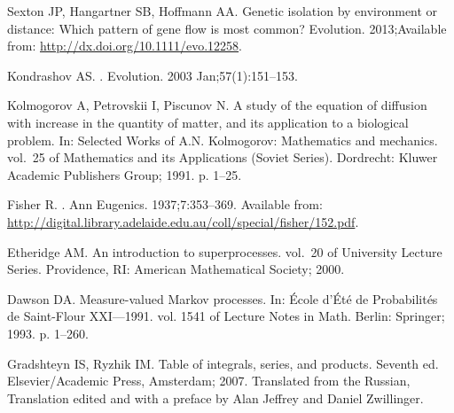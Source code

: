 \documentclass[10pt,letterpaper]{article}
\begin{document}
\begin{thebibliography}{10}
Sexton JP, Hangartner SB, Hoffmann AA.
\newblock Genetic isolation by environment or distance: Which pattern of gene
  flow is most common?
\newblock Evolution. 2013;Available from:
  \url{http://dx.doi.org/10.1111/evo.12258}.

Kondrashov AS.
.
\newblock Evolution. 2003 Jan;57(1):151--153.

Kolmogorov A, Petrovskii I, Piscunov N.
\newblock A study of the equation of diffusion with increase in the quantity of
  matter, and its application to a biological problem.
\newblock In: Selected Works of A.N. Kolmogorov: Mathematics and mechanics.
  vol.~25 of Mathematics and its Applications (Soviet Series). Dordrecht:
  Kluwer Academic Publishers Group; 1991. p. 1--25.

Fisher R.
.
\newblock Ann Eugenics. 1937;7:353--369.
\newblock Available from:
  \url{http://digital.library.adelaide.edu.au/coll/special/fisher/152.pdf}.

Etheridge AM.
\newblock An introduction to superprocesses. vol.~20 of University Lecture
  Series.
\newblock Providence, RI: American Mathematical Society; 2000.

Dawson DA.
\newblock Measure-valued {Markov} processes.
\newblock In: École d'Été de Probabilités de Saint-Flour XXI---1991. vol.
  1541 of Lecture Notes in Math. Berlin: Springer; 1993. p. 1--260.

Gradshteyn IS, Ryzhik IM.
\newblock Table of integrals, series, and products.
\newblock Seventh ed. Elsevier/Academic Press, Amsterdam; 2007.
\newblock Translated from the Russian, Translation edited and with a preface by
  Alan Jeffrey and Daniel Zwillinger.

\end{thebibliography}
\end{document}
